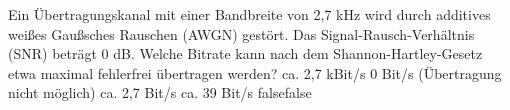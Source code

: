     {Ein Übertragungskanal mit einer Bandbreite von 2,7 kHz wird durch additives weißes Gaußsches Rauschen (AWGN) gestört. Das Signal-Rausch-Verhältnis (SNR) beträgt 0 dB. Welche Bitrate kann nach dem Shannon-Hartley-Gesetz etwa maximal fehlerfrei übertragen werden?}
    {ca. 2,7 kBit/s}
    {0 Bit/s (Übertragung nicht möglich)}
    {ca. 2,7 Bit/s}
    {ca. 39 Bit/s}
    {false}{false}